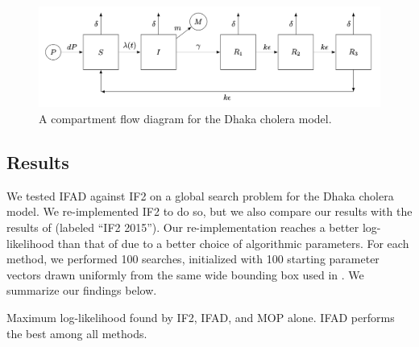 \documentclass[numsec,webpdf,modern,medium,namedate]{oup-authoring-template}
\newcommand\arxiv[2]{#2} %
\theoremstyle{thmstyleone}%
\theoremstyle{thmstyletwo}%
\theoremstyle{thmstylethree}%
\begin{document}
\begin{figure}[htbp!]
    \centering
    \includegraphics[width=\arxiv{14cm}{\textwidth}]{imgs/095/tikzcholera.png}
    \vspace*{-7mm}
    \caption{A compartment flow diagram for the \cite{king08} Dhaka cholera model.}
    \label{fig:tikz-cholera}
    \arxiv{}{\vspace*{-3mm}}
\end{figure}


\subsection{Results}

We tested IFAD against IF2 on a global search problem for the Dhaka cholera model.
We re-implemented IF2 to do so, but we also compare our results with the results of \cite{ionides15} (labeled ``IF2 2015'').
Our re-implementation reaches a better log-likelihood than that of \cite{ionides15} due to a better choice of algorithmic parameters.
For each method, we performed 100 searches, initialized with 100 starting parameter vectors drawn uniformly from the same wide bounding box used in \cite{ionides15}. We summarize our findings below. 

  
\begin{table}[htbp!]
\centering

\caption{Maximum log-likelihood found by IF2, IFAD, and MOP alone. IFAD performs the best among all methods.}
\arxiv{}{\vspace*{-7mm}}
\label{table:mle}
\end{table}
\end{document}

